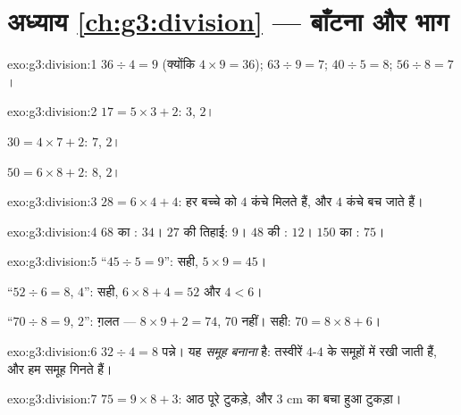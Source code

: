 \section*{अध्याय \ref{ch:g3:division} --- बाँटना और भाग}

\begin{solution}{exo:g3:division:1}
$36 \div 4 = 9$ (क्योंकि $4 \times 9 = 36$); \quad
$63 \div 9 = 7$; \quad $40 \div 5 = 8$; \quad $56 \div 8 = 7$।
\end{solution}

\begin{solution}{exo:g3:division:2}
$17 = 5 \times 3 + 2$:  $3$,  $2$।

$30 = 4 \times 7 + 2$:  $7$,  $2$।

$50 = 6 \times 8 + 2$:  $8$,  $2$।
\end{solution}

\begin{solution}{exo:g3:division:3}
$28 = 6 \times 4 + 4$: हर बच्चे को $4$ कंचे मिलते हैं, और $4$
कंचे बच जाते हैं।
\end{solution}

\begin{solution}{exo:g3:division:4}
$68$ का : $34$। $27$ की तिहाई: $9$। $48$ की : $12$।
$150$ का : $75$।
\end{solution}

\begin{solution}{exo:g3:division:5}
``$45 \div 5 = 9$'': सही, $5 \times 9 = 45$।

``$52 \div 6 = 8$,  $4$'': सही, $6 \times 8 + 4 = 52$ और
$4 < 6$।

``$70 \div 8 = 9$,  $2$'': ग़लत --- $8 \times 9 + 2 = 74$,
$70$ नहीं। सही: $70 = 8 \times 8 + 6$।
\end{solution}

\begin{solution}{exo:g3:division:6}
$32 \div 4 = 8$ पन्ने। यह \emph{समूह बनाना} है: तस्वीरें $4$-$4$
के समूहों में रखी जाती हैं, और हम समूह गिनते हैं।
\end{solution}

\begin{solution}{exo:g3:division:7}
$75 = 9 \times 8 + 3$: आठ पूरे टुकड़े, और $3$ cm का बचा हुआ
टुकड़ा।
\end{solution}

